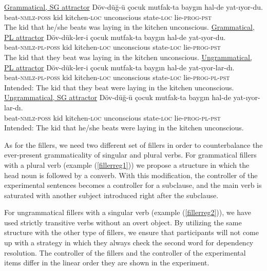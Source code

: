 \documentclass[11pt,a4paper]{article}
\begin{document}
\begin{exe}
\ex
\begin{xlist}
\ex \underline{Grammatical, SG attractor} \label{reg1}
\gll D\"{o}v-d\"{u}\u{g}-\"{u} \c{c}ocuk mutfak-ta bayg{\i}n hal-de yat-{\i}yor-du.\\
beat-\textsc{nmlz}-\textsc{poss} kid kitchen-\textsc{loc} unconscious state-\textsc{loc} lie-\textsc{prog}-\textsc{pst}\\ 
\glt The kid that he/she beats was laying in the kitchen unconscious.
\ex \underline{Grammatical, PL attractor} \label{reg2}
\gll D\"{o}v-d\"{u}k-ler-i \c{c}ocuk mutfak-ta bayg{\i}n hal-de yat-{\i}yor-du.\\
beat-\textsc{nmlz}-\textsc{pl}-\textsc{poss} kid kitchen-\textsc{loc} unconscious state-\textsc{loc} lie-\textsc{prog}-\textsc{pst}\\
\glt The kid that they beat was laying in the kitchen unconscious.
\ex \underline{Ungrammatical, PL attractor} \label{reg3}
\gll D\"{o}v-d\"{u}k-ler-i \c{c}ocuk mutfak-ta bayg{\i}n hal-de yat-{\i}yor-lar-d{\i}.\\
beat-\textsc{nmlz}-\textsc{pl}-\textsc{poss} kid kitchen-\textsc{loc} unconscious state-\textsc{loc} lie-\textsc{prog}-\textsc{pl}-\textsc{pst}\\
\glt Intended: The kid that they beat were laying in the kitchen unconscious.
\ex \underline{Ungrammatical, SG attractor} \label{reg4}
\gll D\"{o}v-d\"{u}\u{g}-\"{u} \c{c}ocuk mutfak-ta bayg{\i}n hal-de yat-{\i}yor-lar-d{\i}.\\
beat-\textsc{nmlz}-\textsc{poss} kid kitchen-\textsc{loc} unconscious state-\textsc{loc} lie-\textsc{prog}-\textsc{pl}-\textsc{pst}\\
\glt Intended: The kid that he/she beats were laying in the kitchen unconscious.
\end{xlist}
\end{exe}

As for the fillers, we need two different set of fillers in order to
counterbalance the ever-present grammaticality of singular and plural
verbs. For grammatical fillers with a plural verb (example
(\ref{fillerreg1})) we propose a structure in which the head noun is
followed by a converb. With this modification, the controller of the
experimental sentences becomes a controller for a subclause, and the
main verb is saturated with another subject introduced right after the
subclause.

For ungrammatical fillers with a singular verb (example
(\ref{fillerreg2})), we have used strictly transitive verbs without an
overt object. By utilizing the same structure with the other type of
fillers, we ensure that participants will not come up with a strategy in
which they always check the second word for dependency resolution. The
controller of the fillers and the controller of the experimental items
differ in the linear order they are shown in the experiment.
\end{document}
